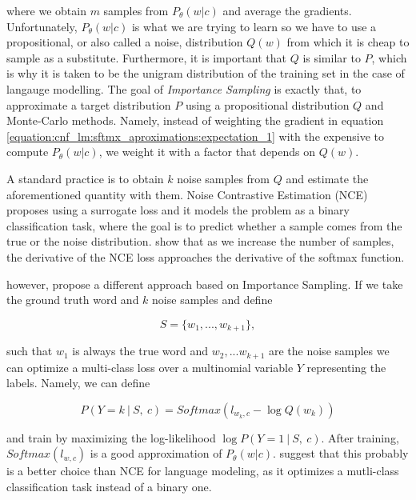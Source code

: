 where we obtain $ m $ samples from $ P_\theta( w | c ) $ and average the gradients. Unfortunately, $ P_\theta(w | c) $ is what we are trying to learn so we have to use a propositional, or also called a noise, distribution $ Q(w) $ from which it is cheap to sample as a substitute. Furthermore, it is important that $Q$ is similar to $P$, which is why it is taken to be the unigram distribution of the training set in the case of langauge modelling. The goal of \emph{Importance Sampling} is exactly that, to approximate a target distribution $ P $ using a propositional distribution $ Q $ and Monte-Carlo methods. Namely, instead of weighting the gradient in equation \ref{equation:cnf_lm:sftmx_aproximations:expectation_1} with the expensive to compute $ P_\theta( w | c ) $, we weight it with a factor that depends on $ Q(w) $.

A standard practice is to obtain $ k $ noise samples from $ Q $ and estimate the aforementioned quantity with them. Noise Contrastive Estimation (NCE) \citep{gutmann2010noise} proposes using a surrogate loss and it models the problem as a binary classification task, where the goal is to predict whether a sample comes from the true or the noise distribution. \citet{gutmann2010noise} show that as we increase the number of samples, the derivative of the NCE loss approaches the derivative of the softmax function.

\citet{jozefowicz2016exploring} however, propose a different approach based on Importance Sampling. If we take the ground truth word and $ k $ noise samples and define

\begin{displaymath}
    S = \{w_1, ..., w_{k+1} \},
\end{displaymath}

such that $ w_1 $ is always the true word and $ w_2, ... w_{k+1} $ are the noise samples we can optimize a multi-class loss over a multinomial variable $ Y $ representing the labels. Namely, we can define

\begin{displaymath}
    P(Y=k \ | \ S, \ c) = Softmax(l_{w_k, c} - \log Q(w_k))
\end{displaymath}

and train by maximizing the log-likelihood $ \log P(Y = 1 \ | \ S, \ c) $. After training, $ Softmax(l_{w, c}) $ is a good approximation of $ P_\theta(w|c) $. \citet{jozefowicz2016exploring} suggest that this probably is a better choice than NCE for language modeling, as it optimizes a mutli-class classification task instead of a binary one.
